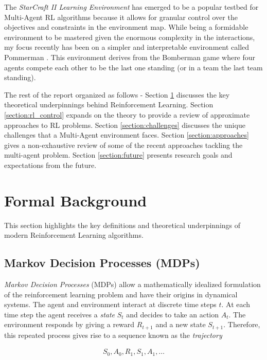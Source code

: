\documentclass[12pt,a4paper]{article}
\begin{document}
The \textit{StarCraft II Learning Environment} \cite{vinyals2017starcraft} has emerged to be a
popular testbed for Multi-Agent RL algorithms because it allows for granular control over the
objectives and constraints in the environment map. While being a formidable environment to be
mastered given the enormous complexity in the interactions, my focus recently has been on a
simpler and interpretable environment called Pommerman \cite{pommerman}. This environment
derives from the Bomberman game where four agents compete each other to be the last one
standing (or in a team the last team standing).

The rest of the report organized as follows - Section \ref{section:background} discusses the
key theoretical underpinnings behind Reinforcement Learning. Section \ref{section:rl_control}
expands on the theory to provide a review of approximate approaches to RL problems. Section
\ref{section:challenges} discusses the unique challenges that a Multi-Agent environment faces.
Section \ref{section:approaches} gives a non-exhaustive review of some of the recent 
approaches tackling the multi-agent problem. Section \ref{section:future} presents research
goals and expectations from the future.

\section{Formal Background} \label{section:background}

This section highlights the key definitions and theoretical underpinnings of modern
Reinforcement Learning algorithms.

\subsection{Markov Decision Processes (MDPs)}

\textit{Markov Decision Processes} (MDPs) allow a mathematically idealized formulation of
the reinforcement learning problem and have their origins in dynamical systems. The agent
and environment interact at discrete time steps $t$. At each time step the agent receives a
\textit{state} $S_t$ and decides to take an action $A_t$. The environment responds by giving
a reward $R_{t+1}$ and a new state $S_{t+1}$. Therefore, this repeated process gives rise to
a sequence known as the \textit{trajectory}

\begin{align} \label{eq:sample_trajectory}
S_0,A_0,R_1,S_1,A_1,\dotsc
\end{align}
\end{document}
